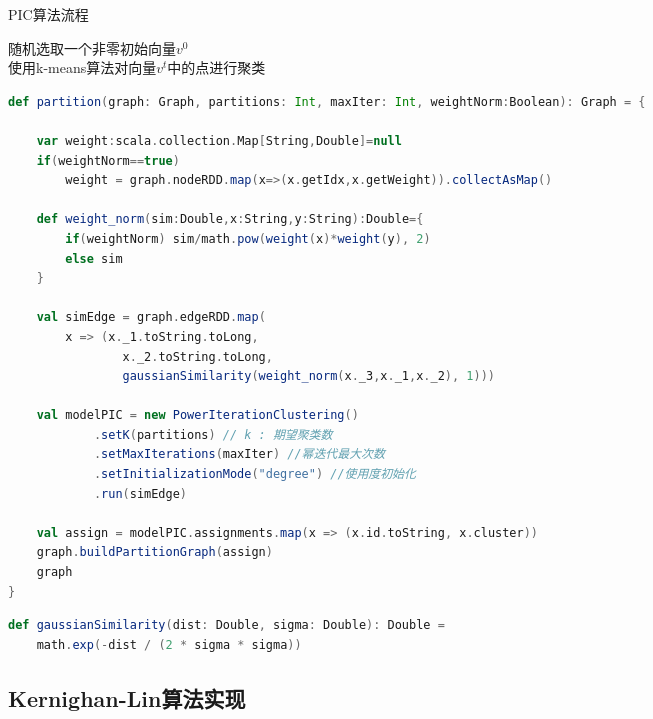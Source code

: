 \begin{algorithm}[htbp]
\caption{PIC算法流程}
\SetAlgoLined
{}
随机选取一个非零初始向量$v^0$ \\
使用k-means算法对向量$v^t$中的点进行聚类
\end{algorithm}

\begin{lstlisting}[language=Scala]
def partition(graph: Graph, partitions: Int, maxIter: Int, weightNorm:Boolean): Graph = {

    var weight:scala.collection.Map[String,Double]=null
    if(weightNorm==true)
        weight = graph.nodeRDD.map(x=>(x.getIdx,x.getWeight)).collectAsMap()

    def weight_norm(sim:Double,x:String,y:String):Double={
        if(weightNorm) sim/math.pow(weight(x)*weight(y), 2)
        else sim
    }

    val simEdge = graph.edgeRDD.map(
        x => (x._1.toString.toLong,
                x._2.toString.toLong,
                gaussianSimilarity(weight_norm(x._3,x._1,x._2), 1)))

    val modelPIC = new PowerIterationClustering()
            .setK(partitions) // k : 期望聚类数
            .setMaxIterations(maxIter) //幂迭代最大次数
            .setInitializationMode("degree") //使用度初始化
            .run(simEdge)

    val assign = modelPIC.assignments.map(x => (x.id.toString, x.cluster))
    graph.buildPartitionGraph(assign)
    graph
}
\end{lstlisting}

\begin{lstlisting}[language=Scala]
def gaussianSimilarity(dist: Double, sigma: Double): Double =
    math.exp(-dist / (2 * sigma * sigma))
\end{lstlisting}


\subsection{Kernighan-Lin算法实现}

\begin{lstlisting}[language=Scala]
\end{lstlisting}

